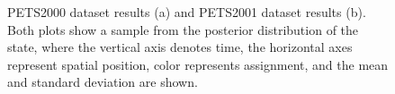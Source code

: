 \documentclass[twocolumn, final]{svjour3}
\begin{document}
\begin{figure}[h]
  \centering
   \hspace{1mm}           
  \caption{PETS2000 dataset results (a) and PETS2001 dataset results (b). Both plots show a sample from the posterior distribution of the state, where the vertical axis denotes time, the horizontal axes represent spatial position, color represents assignment, and the mean and standard deviation are shown.}
  \label{fig:benchmark_results_1}
\end{figure}
\end{document}
